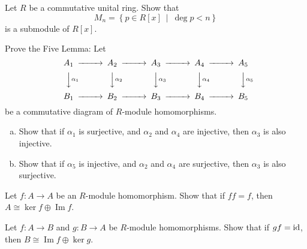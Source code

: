 \documentclass{problemset}
\DeclareMathOperator{\im}{Im}
\begin{document}
\begin{exercise} Let \(R\) be a commutative unital ring.  Show that \[M_n = \left\{ p \in R[x]\ \middle|\ \deg p < n \right\}\] is a submodule of \(R[x]\).
\end{exercise}



\begin{exercise} Prove the Five Lemma: Let
\[\begin{CD}
A_1 @>>> A_2 @>>> A_3 @>>> A_4 @>>> A_5\\
@VV\alpha _1V @VV\alpha _2V @VV\alpha _3V @VV\alpha _4V @VV\alpha _5V \\
B_1 @>>> B_2 @>>> B_3 @>>> B_4 @>>> B_5\\
\end{CD}\]
be a commutative diagram of \(R\)-module homomorphisms.
\begin{enumerate}[(a)]
\item Show that if \(\alpha _1\) is surjective, and \(\alpha _2\) and \(\alpha _4\) are injective, then \(\alpha _3\) is also injective.
\item Show that if \(\alpha _5\) is injective, and \(\alpha _2\) and \(\alpha _4\) are surjective, then \(\alpha _3\) is also surjective.
\end{enumerate}
\end{exercise}




\begin{exercise} 
Let \(f: A \to A\) be an \(R\)-module homomorphism.  Show that if \(ff=f\), then \(A \cong \ker f \oplus \im f\).
\end{exercise}


\begin{exercise} Let \(f: A \to B\) and \(g: B \to A\) be \(R\)-module homomorphisms.  Show that if \(gf={\rm id}\), then \(B \cong \im f \oplus \ker g\).
\end{exercise}


\begin{exercise} 
\end{exercise}



\end{document}

